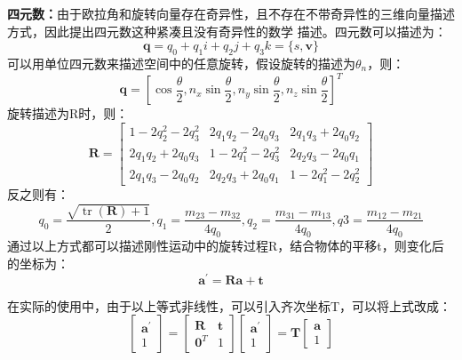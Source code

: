 \textbf{四元数：}由于欧拉角和旋转向量存在奇异性，且不存在不带奇异性的三维向量描述方式，因此提出四元数这种紧凑且没有奇异性的数学
描述。四元数可以描述为：
\begin{equation}
  \mathbf{q}=q_{0}+q_{1} i+q_{2} j+q_{3} k=\{s, \mathbf{v}\}
\end{equation}
可以用单位四元数来描述空间中的任意旋转，假设旋转的描述为$\theta_{n}$，则：
\begin{equation}
  \mathbf{q}=\left[\cos \frac{\theta}{2}, n_{x} \sin \frac{\theta}{2}, n_{y} \sin \frac{\theta}{2}, n_{z} \sin \frac{\theta}{2}\right]^{T}
\end{equation}
旋转描述为R时，则：
\begin{equation}
\mathbf{R}=\left[\begin{array}{ccc}{1-2 q_{2}^{2}-2 q_{3}^{2}} & {2 q_{1} q_{2}-2 q_{0} q_{3}} & {2 q_{1} q_{3}+2 q_{0} q_{2}} \\ {2 q_{1} q_{2}+2 q_{0} q_{3}} & {1-2 q_{1}^{2}-2 q_{3}^{2}} & {2 q_{2} q_{3}-2 q_{0} q_{1}} \\ {2 q_{1} q_{3}-2 q_{0} q_{2}} & {2 q_{2} q_{3}+2 q_{0} q_{1}} & {1-2 q_{1}^{2}-2 q_{2}^{2}}\end{array}\right]
\end{equation}
反之则有：
\begin{equation}
  q_{0}=\frac{\sqrt{\operatorname{tr}(\mathbf{R})+1}}{2}, q_{1}=\frac{m_{23}-m_{32}}{4 q_{0}}, q_{2}=\frac{m_{31}-m_{13}}{4 q_{0}}, q 3=\frac{m_{12}-m_{21}}{4 q_{0}}
\end{equation}
通过以上方式都可以描述刚性运动中的旋转过程R，结合物体的平移t，则变化后的坐标为：
\begin{equation}
  \mathbf{a}^{\prime}=\mathbf{R} \mathbf{a}+\mathbf{t}
\end{equation}

在实际的使用中，由于以上等式非线性，可以引入齐次坐标T，可以将上式改成：
\begin{equation}
\left[\begin{array}{l}{\mathbf{a}^{\prime}} \\ {1}\end{array}\right]=\left[\begin{array}{ll}{\mathbf{R}} & {\mathbf{t}} \\ {\mathbf{0}^{T}} & {1}\end{array}\right]\left[\begin{array}{l}{\mathbf{a}^{\prime}} \\ {1}\end{array}\right]=\mathbf{T}\left[\begin{array}{l}{\mathbf{a}} \\ {1}\end{array}\right]
\end{equation}

